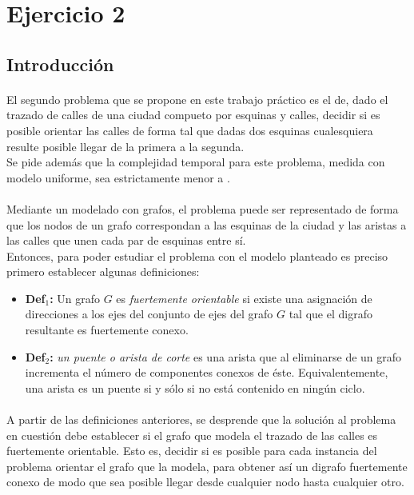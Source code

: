 \section{Ejercicio 2}

\subsection{Introducción}
\label{intro2}

\paragraph{}
El segundo problema que se propone en este trabajo práctico es el de, dado el trazado de calles de una ciudad compueto por esquinas y calles, decidir si es posible orientar las calles de forma tal que dadas dos esquinas cualesquiera resulte posible llegar de la primera a la segunda.\\
Se pide además que la complejidad temporal para este problema, medida con modelo uniforme, sea estrictamente menor a .

\paragraph{}
Mediante un modelado con grafos, el problema puede ser representado de forma que los nodos de un grafo correspondan a las esquinas de la ciudad y las aristas a las calles que unen cada par de esquinas entre sí. \\
Entonces, para poder estudiar el problema con el modelo planteado es preciso primero establecer algunas definiciones:
\begin{itemize}
	\item \textbf{Def$_1$:} Un grafo $G$ es \textit{fuertemente orientable} si existe una asignación de direcciones a los ejes del conjunto de ejes del grafo $G$ tal que el digrafo resultante es fuertemente conexo. 
	\item \textbf{Def$_2$:} \textit{un puente o arista de corte} es una arista que al eliminarse de un grafo incrementa el número de componentes conexos de éste. Equivalentemente, una arista es un puente si y sólo si no está contenido en ningún ciclo.
\end{itemize}

\paragraph{}
A partir de las definiciones anteriores, se desprende que la solución al problema en cuestión debe establecer si el grafo que modela el trazado de las calles es fuertemente orientable. Esto es, decidir si es posible para cada instancia del problema orientar el grafo que la modela, para obtener así un digrafo fuertemente conexo de modo que sea posible llegar desde cualquier nodo hasta cualquier otro.

